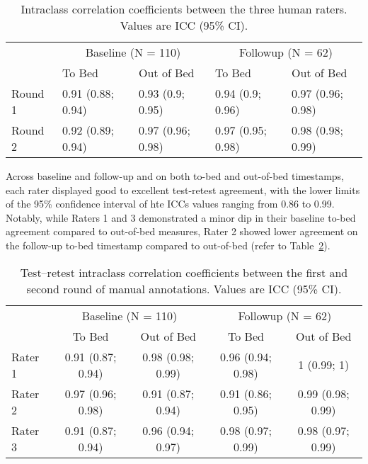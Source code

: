 \documentclass[
  10pt,
]{scrbook}
\begin{document}
\begingroup

\footnotesize

\hypertarget{tbl-man_icc_man_man}{}
\begin{longtable}{lllll}
\caption{\label{tbl-man_icc_man_man}Intraclass correlation coefficients between the three human raters.
Values are ICC (95\% CI). }\tabularnewline

\toprule
 & \multicolumn{2}{c}{Baseline (N = 110)} & \multicolumn{2}{c}{Followup (N = 62)} \\ 
\cmidrule(lr){2-3} \cmidrule(lr){4-5}
 & To Bed & Out of Bed & To Bed & Out of Bed \\ 
\midrule
Round 1 & 0.91 (0.88; 0.94) & 0.93 (0.9; 0.95) & 0.94 (0.9; 0.96) & 0.97 (0.96; 0.98) \\ 
Round 2 & 0.92 (0.89; 0.94) & 0.97 (0.96; 0.98) & 0.97 (0.95; 0.98) & 0.98 (0.98; 0.99) \\ 
\bottomrule
\end{longtable}

\endgroup

Across baseline and follow-up and on both to-bed and out-of-bed
timestamps, each rater displayed good to excellent test-retest
agreement, with the lower limits of the 95\% confidence interval of hte
ICCs values ranging from 0.86 to 0.99. Notably, while Raters 1 and 3
demonstrated a minor dip in their baseline to-bed agreement compared to
out-of-bed measures, Rater 2 showed lower agreement on the follow-up
to-bed timestamp compared to out-of-bed (refer to
Table~\ref{tbl-man_icc_test_retest}).

\begingroup

\footnotesize

\hypertarget{tbl-man_icc_test_retest}{}
\begin{longtable}{lcccc}
\caption{\label{tbl-man_icc_test_retest}Test--retest intraclass correlation coefficients between the first and
second round of manual annotations. Values are ICC (95\% CI). }\tabularnewline

\toprule
 & \multicolumn{2}{c}{Baseline (N = 110)} & \multicolumn{2}{c}{Followup (N = 62)} \\ 
\cmidrule(lr){2-3} \cmidrule(lr){4-5}
 & To Bed & Out of Bed & To Bed & Out of Bed \\ 
\midrule
Rater 1 & 0.91 (0.87; 0.94) & 0.98 (0.98; 0.99) & 0.96 (0.94; 0.98) & 1 (0.99; 1) \\ 
Rater 2 & 0.97 (0.96; 0.98) & 0.91 (0.87; 0.94) & 0.91 (0.86; 0.95) & 0.99 (0.98; 0.99) \\ 
Rater 3 & 0.91 (0.87; 0.94) & 0.96 (0.94; 0.97) & 0.98 (0.97; 0.99) & 0.98 (0.97; 0.99) \\ 
\bottomrule
\end{longtable}
\end{document}
